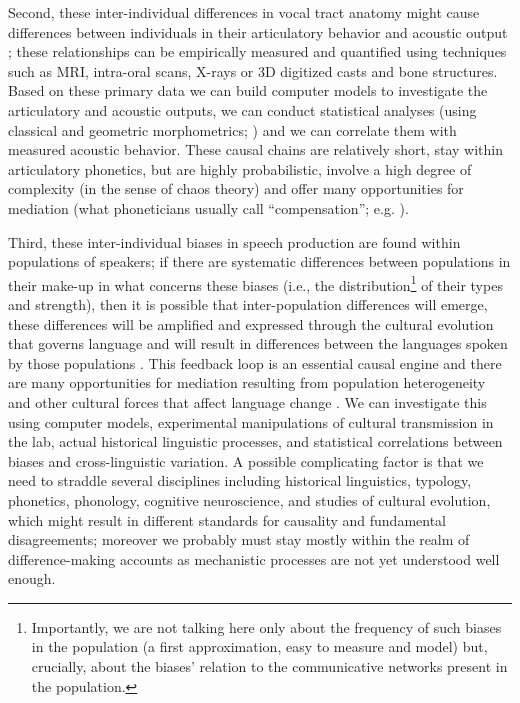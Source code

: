 \documentclass[output=paper]{langsci/langscibook}
\begin{document}
Second, these inter-individual differences in vocal tract anatomy might cause differences between individuals in their articulatory behavior and acoustic output \citep{Brunner2005,Brunner2009,Debruyne2002}; these relationships can be empirically measured and quantified using techniques such as MRI, intra-oral scans, X-rays or 3D digitized casts and bone structures. Based on these primary data we can build computer models to investigate the articulatory and acoustic outputs, we can conduct statistical analyses (using classical and geometric morphometrics; \citealt{Zelditch2012}) and we can correlate them with measured acoustic behavior. These causal chains are relatively short, stay within articulatory phonetics, but are highly probabilistic, involve a high degree of complexity (in the sense of chaos theory) and offer many opportunities for mediation (what phoneticians usually call “compensation”; e.g. \citealt{Brunner2006}).

\largerpage
{}   Third, these inter-individual biases in speech production are found within populations of speakers; if there are systematic differences between populations in their make-up in what concerns these biases (i.e., the distribution\footnote{Importantly, we are not talking here only about the frequency of such biases in the population (a first approximation, easy to measure and model) but, crucially, about the biases' relation to the communicative networks present in the population.} of their types and strength), then it is possible that inter-population differences will emerge, these differences will be amplified and expressed through the cultural evolution that governs language and will result in differences between the languages spoken by those populations \citep{Levinson2013}. This feedback loop is an essential causal engine and there are many opportunities for mediation resulting from population heterogeneity and other cultural forces that affect language change \citep{Dediu2011b}. We can investigate this using computer models, experimental manipulations of cultural transmission in the lab, actual historical linguistic processes, and statistical correlations between biases and cross-linguistic variation. A possible complicating factor is that we need to straddle several disciplines including historical linguistics, typology, phonetics, phonology, cognitive neuroscience, and studies of cultural evolution, which might result in different standards for causality and fundamental disagreements; moreover we probably must stay mostly within the realm of difference-making accounts as mechanistic processes are not yet understood well enough.
\end{document}

